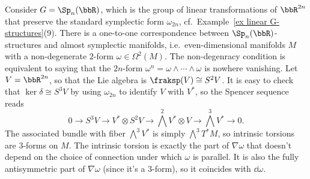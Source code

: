 \begin{example}
    Consider $G=\Sp_n(\bbR)$, which is the group of linear transformations of $\bbR^{2n}$ that preserve the standard symplectic form $\omega_{2n}$, cf.\ Example~\ref{ex linear G-structures}(9). There is a one-to-one correspondence between $\Sp_n(\bbR)$-structures and almost symplectic manifolds, i.e.\ even-dimensional manifolds $M$ with a non-degenerate $2$-form $\omega\in \Omega^2(M)$. The non-degenracy condition is equivalent to saying that the $2n$-form $\omega^n=\omega\wedge\cdots\wedge\omega$ is nowhere vanishing.
    Let $V=\bbR^{2n}$, so that the Lie algebra is $\fraksp(V)\cong S^2 V$. It is easy to check that $\ker\delta\cong S^3 V$ by using $\omega_{2n}$ to identify $V$ with $V^\ast$, so the Spencer sequence reads 
    \[0\to S^3 V\to V^\ast \otimes S^2V\to \bigwedge^2 V^\ast\otimes V\to \bigwedge^3 V^\ast\to 0.\]
    The associated bundle with fiber $\bigwedge^3 V^\ast$ is simply $\bigwedge^3 T^\ast M$, so intrinsic torsions are $3$-forms on $M$. The intrinsic torsion is exactly the part of $\nabla\omega$ that doesn't depend on the choice of connection under which $\omega$ is parallel. It is also the fully antisymmetric part of $\nabla\omega$ (since it's a $3$-form), so it coincides with $\dd\omega$.


\end{example}
